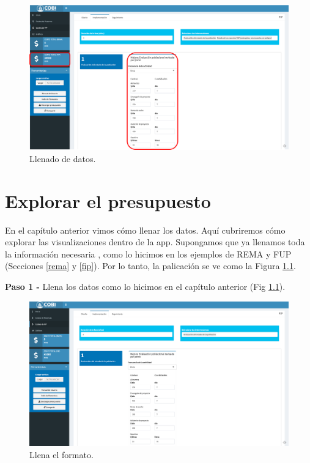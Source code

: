\documentclass[
]{book}
\begin{document}
\begin{figure}
\centering
\includegraphics{images/fip-imp-7.png}
\caption{\label{fig:fip-imp-7}Llenado de datos.}
\end{figure}

\hypertarget{explorar}{%
\chapter{Explorar el presupuesto}\label{explorar}}

En el capítulo anterior vimos cómo llenar los datos. Aquí cubriremos cómo explorar las visualizaciones dentro de la app. Supongamos que ya llenamos toda la información necesaria , como lo hicimos en los ejemplos de REMA y FUP (Secciones \ref{rema} y \ref{fip}). Por lo tanto, la palicación se ve como la Figura \ref{fig:exp-1}.

\textbf{Paso 1 - } Llena los datos como lo hicimos en el capítulo anterior (Fig \ref{fig:exp-1}).

\begin{figure}
\centering
\includegraphics{images/exp-1.png}
\caption{\label{fig:exp-1}Llena el formato.}
\end{figure}
\end{document}
